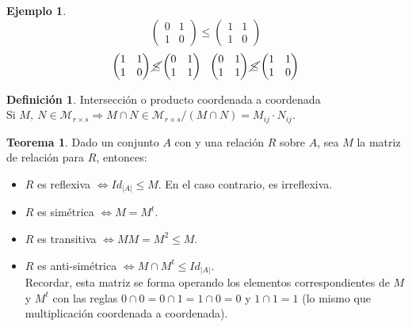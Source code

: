\documentclass[10pt]{article}
\theoremstyle{definition}
\newtheorem{definition}{Definición}[section]
\newtheorem{theorem}{Teorema}[section]
\newtheorem{example}{Ejemplo}[section]
\begin{document}
    \begin{example}{ \ }\\
        $$\begin{pmatrix} 0 & 1\\1 & 0 \end{pmatrix}\le \begin{pmatrix} 1 & 1\\1 & 0 \end{pmatrix}$$ 
        $$\begin{pmatrix} 1 & 1\\1 & 0 \end{pmatrix} \cancel{\le} \begin{pmatrix} 0 & 1\\ 1 & 1 \end{pmatrix}\ \
        \begin{pmatrix} 0&1\\1&1 \end{pmatrix} \cancel{\le} \begin{pmatrix} 1&1\\1&0 \end{pmatrix} $$
    \end{example}\hfill\break
    \begin{definition}{Intersección o producto coordenada a coordenada}
        \\Si $M,\ N\in\mathcal{M}_{r\times s}\Rightarrow M\cap N\in\mathcal{M}_{r\times s} / (M\cap N)=M_{ij}\cdot N_{ij}$.
    \end{definition}
    \begin{theorem}
        Dado un conjunto $A$ con y una relación $R$ sobre $A$, sea $M$ la matriz de relación para $R$, entonces:
        \begin{itemize}
            \item $R$ es reflexiva $\Leftrightarrow Id_{|A|}\le M$. En el caso contrario, es irreflexiva.
            \item $R$ es simétrica $\Leftrightarrow M=M^t$.
            \item $R$ es transitiva $\Leftrightarrow MM=M^2\le M$.
            \item $R$ es anti-simétrica $\Leftrightarrow M\cap M^t\le Id_{|A|}$.\\
                Recordar, esta matriz se forma operando los elementos correspondientes de $M$ y $M^t$ con las reglas $0\cap0=0\cap1=1\cap0=0$ y $1\cap1=1$ (lo mismo que multiplicación coordenada a coordenada).
        \end{itemize}
    \end{theorem}
\end{document}
